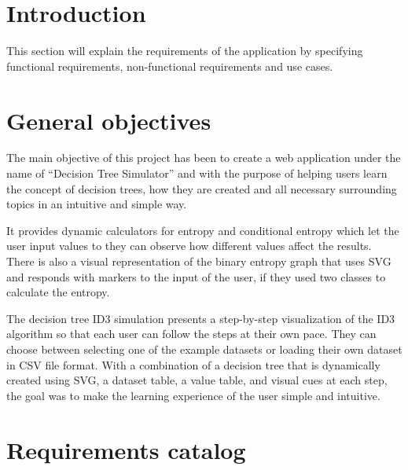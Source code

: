 
\section{Introduction}
This section will explain the requirements of the application by specifying functional requirements, non-functional requirements and use cases.

\section{General objectives}
The main objective of this project has been to create a web application under the name of ``Decision Tree Simulator'' and with the purpose of helping users learn the concept of decision trees, how they are created and all necessary surrounding topics in an intuitive and simple way.

It provides dynamic calculators for entropy and conditional entropy which let the user input values to they can observe how different values affect the results. There is also a visual representation of the binary entropy graph that uses SVG and responds with markers to the input of the user, if they used two classes to calculate the entropy.

The decision tree ID3 simulation presents a step-by-step visualization of the ID3 algorithm so that each user can follow the steps at their own pace. They can choose between selecting one of the example datasets or loading their own dataset in CSV file format. With a combination of a decision tree that is dynamically created using SVG, a dataset table, a value table, and visual cues at each step, the goal was to make the learning experience of the user simple and intuitive.

\section{Requirements catalog}
